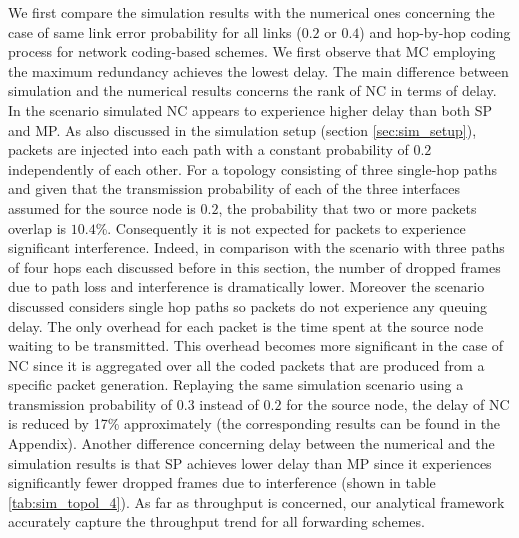 \documentclass[journal, onecolumn, 12pt]{IEEEtran}
\begin{document}
We first compare the simulation results with the numerical ones concerning the case of same link error probability for all links ($0.2$ or $0.4$) and hop-by-hop coding process
for network coding-based schemes.
We first observe that MC employing the maximum redundancy achieves the lowest delay.
The main difference between simulation and the numerical results concerns the rank of NC in terms of delay.
In the scenario simulated NC appears to experience higher delay than both SP and MP.
As also discussed in the simulation setup (section \ref{sec:sim_setup}), packets are injected into each path with a constant probability of $0.2$ independently of each other.
For a topology consisting of three single-hop paths and given that the transmission probability of each of the three interfaces assumed for the source node is $0.2$, the probability that two or more packets overlap is $10.4$\%.
Consequently it is not expected for packets to experience significant interference.
Indeed, in comparison with the scenario with three paths of four hops each discussed before in this section, the number of dropped frames due to path loss and interference is dramatically lower.
Moreover the scenario discussed considers single hop paths so packets do not experience any queuing delay.
The only overhead for each packet is the time spent at the source node waiting to be transmitted.
This overhead becomes more significant in the case of NC since it is aggregated over all the coded packets that are produced from a specific packet generation.
Replaying the same simulation scenario using a transmission probability of $0.3$ instead of $0.2$ for the source node, the delay of NC is reduced by 17\% approximately (the corresponding results can be found in the Appendix).
Another difference concerning delay between the numerical and the simulation results is that SP achieves lower delay than MP since it experiences significantly fewer dropped frames due to interference (shown in table \ref{tab:sim_topol_4}).
As far as throughput is concerned, our analytical framework accurately capture the throughput trend for all forwarding schemes.
\end{document}
